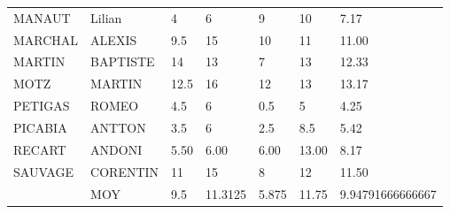 \begin{table}[]
{\begin{tabular}{|l|l|l|l|l|l|l|}
MANAUT                                         & Lilian   & 4     & 6                    & 9     & 10    & 7.17             \\
MARCHAL                                        & ALEXIS   & 9.5   & 15                   & 10    & 11    & 11.00            \\
MARTIN                                         & BAPTISTE & 14    & 13                   & 7     & 13    & 12.33            \\
MOTZ                                           & MARTIN   & 12.5  & 16                   & 12    & 13    & 13.17            \\
PETIGAS                                        & ROMEO    & 4.5   & 6                    & 0.5   & 5     & 4.25             \\
PICABIA                                        & ANTTON   & 3.5   & 6                    & 2.5   & 8.5   & 5.42             \\
RECART                                         & ANDONI   & 5.50  & 6.00                 & 6.00  & 13.00 & 8.17             \\
SAUVAGE                                        & CORENTIN & 11    & 15                   & 8     & 12    & 11.50            \\ \hline
                                               & MOY      & 9.5   & 11.3125              & 5.875 & 11.75 & 9.94791666666667 \\ \hline
\end{tabular}
}
\end{table}

